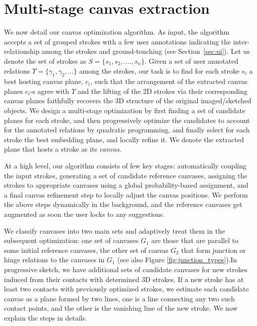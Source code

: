{\section{Multi-stage canvas extraction}
\label{algorithm}

We now detail our canvas optimization algorithm. As input, the algorithm accepts a set of grouped strokes with a few user annotations indicating the inter-relationship among the strokes and ground-touching (see Section~\ref{sec:ui}). Let us denote the set of strokes as $S = \{s_1,s_2,....,s_n\}$. Given a set of user annotated relations $\Upsilon = \{\gamma_1, \gamma_2, \dots\}$ among the strokes, our task is to find for each stroke $s_i$ a best hosting canvas plane, $c_i$, such that the arrangement of the extracted canvas planes $c_i$-s agree with $\Upsilon$ and the lifting of the 2{D} strokes via their corresponding canvas planes faithfully recovers the 3{D} structure of the original imaged/sketched objects. We design a multi-stage optimization  by first finding a set of candidate planes for each stroke, and then progressively optimize the candidates to account for the annotated relations by quadratic programming, and finally select for each stroke the best embedding plane, and locally refine it. We denote the extracted plane that hosts a stroke as its \emph{canvas}.

At a high level, our algorithm consists of few key stages: automatically coupling the input strokes, generating a set of candidate reference canvases, assigning the strokes to appropriate canvases using a global probability-based assignment, and a final canvas refinement step to locally adjust the canvas positions.
%
We perform the above steps dynamically in the background, and the reference canvases get augmented as soon the user locks to any suggestions.

We classify  canvases into two main sets and adaptively treat them in the subsequent optimization: one set of canvases $G_1$ are those that are parallel to some initial reference canvases, the other set of canvas $G_2$ that form junction or hinge relations to the canvases in $G_1$ (see also Figure \ref{fig:junction_types}).In progressive sketch, we have additional sets of candidate canvases for new strokes induced from their contacts with determined 3D strokes. If a new stroke has at least two contacts with previously optimized strokes, we estimate each candidate canvas as a plane formed by two lines, one is a line connecting any two such contact points, and the other is the vanishing line of the new stroke. We now explain the steps in details.



}
